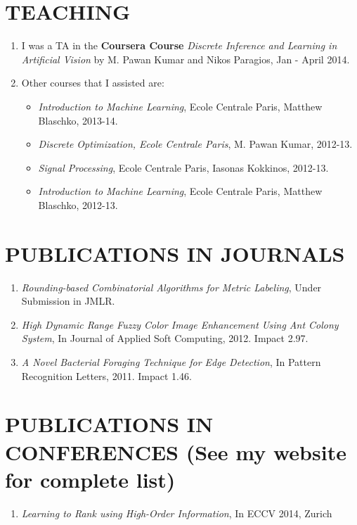\documentclass{res}
\begin{document}
\begin{resume}
        \section{TEACHING}
        \begin{enumerate}
        \item I was a TA in the {\bf Coursera Course} \emph{Discrete Inference and Learning in Artificial Vision} by M. Pawan Kumar and Nikos Paragios, Jan - April 2014.
        \item Other courses that I assisted are:
        \begin{itemize}
        \item \emph{Introduction to Machine Learning}, Ecole Centrale Paris, Matthew Blaschko, 2013-14.
        \item \emph{Discrete Optimization, Ecole Centrale Paris}, M. Pawan Kumar, 2012-13.
        \item \emph{Signal Processing}, Ecole Centrale Paris, Iasonas Kokkinos, 2012-13. 
        \item \emph{Introduction to Machine Learning}, Ecole Centrale Paris, Matthew Blaschko, 2012-13.
        \end{itemize}
        \end{enumerate}


        \section{PUBLICATIONS IN JOURNALS} 
        \begin{enumerate}
        \item \emph{Rounding-based Combinatorial Algorithms for Metric Labeling}, {Under Submission in JMLR}.
        \item \emph{High Dynamic Range Fuzzy Color Image Enhancement Using Ant Colony System}, {In Journal of Applied Soft Computing}, 2012. Impact 2.97.
        \item \emph{A Novel Bacterial Foraging Technique for Edge Detection}, {In Pattern Recognition Letters}, 2011. Impact 1.46.

        \end{enumerate}  


        \section{PUBLICATIONS IN CONFERENCES (See my website for complete list)} 
        \begin{enumerate}
        \item \emph{Learning to Rank using High-Order Information}, {In ECCV 2014, Zurich}


\end{enumerate}
\end{resume}
\end{document}
